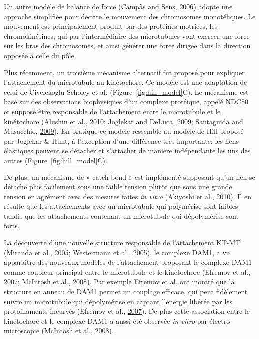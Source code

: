 \documentclass[12pt,a4paper,twoside,openright]{book}
\begin{document}
Un autre modèle de balance de force (Campàs and Sens,
\hyperref[ref-Campas2006]{2006}) adopte une approche simplifiée pour
décrire le mouvement des chromosomes monotéliques. Le mouvement est
principalement produit par des protéines motrices, les chromokinésines,
qui par l'intermédiaire des microtubules vont exercer une force sur les
bras des chromosomes, et ainsi générer une force dirigée dans la
direction opposée à celle du pôle.

Plus récemment, un troisième mécanisme alternatif fut proposé pour
expliquer l'attachement du microtubule au kinétochore. Ce modèle est une
adaptation de celui de Civelekoglu-Scholey et al.
(Figure~\ref{fig:hill_model}C). Le mécanisme est basé sur des
observations biophysiques d'un complexe protéique, appelé NDC80 et
supposé être responsable de l'attachement entre le microtubule et le
kinétochore (Alushin et al., \hyperref[ref-Alushin2010]{2010}; Joglekar
and DeLuca, \hyperref[ref-Joglekar2009]{2009}; Santaguida and Musacchio,
\hyperref[ref-Santaguida2009a]{2009}). En pratique ce modèle ressemble
au modèle de Hill proposé par Joglekar \& Hunt, à l'exception d'une
différence très importante: les liens élastiques peuvent se détacher et
s'attacher de manière indépendante les uns des autres
(Figure~\ref{fig:hill_model}C).

De plus, un mécanisme de « catch bond » est implémenté supposant qu'un
lien se détache plus facilement sous une faible tension plutôt que sous
une grande tension en agrément avec des mesures faites \emph{in vitro}
(Akiyoshi et al., \hyperref[ref-Akiyoshi2010]{2010}). Il en résulte que
les attachements avec un microtubule qui polymérise sont faibles tandis
que les attachements contenant un microtubule qui dépolymérise sont
forts.

La découverte d'une nouvelle structure responsable de l'attachement
KT-MT (Miranda et al., \hyperref[ref-Miranda2005]{2005}; Westermann et
al., \hyperref[ref-Westermann2005]{2005}), le complexe DAM1, a vu
apparaître des nouveaux modèles de l'attachement proposant le complexe
DAM1 comme coupleur principal entre le microtubule et le kinétochore
(Efremov et al., \hyperref[ref-Efremov2007]{2007}; McIntosh et al.,
\hyperref[ref-McIntosh2008]{2008}). Par exemple Efremov et al. ont
montré que la structure en anneau de DAM1 permet un couplage efficace,
qui peut fidèlement suivre un microtubule qui dépolymérise en captant
l'énergie libérée par les protofilaments incurvés (Efremov et al.,
\hyperref[ref-Efremov2007]{2007}). De plus cette association entre le
kinétochore et le complexe DAM1 a aussi été observée \emph{in vitro} par
électro-microscopie (McIntosh et al.,
\hyperref[ref-McIntosh2008]{2008}).
\end{document}
